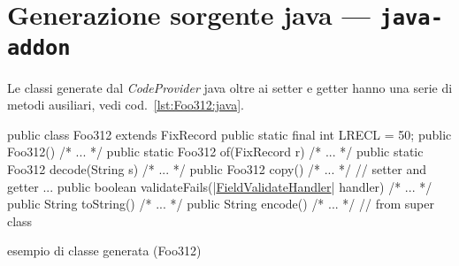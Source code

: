 \documentclass[a4paper,10pt]{report}
\newif\ifesource
\newenvironment{elisting}[1][H]
  {\captionsetup{aboveskip=0pt}\begin{listing}[#1]}
  {\end{listing}%
}
\begin{document}
\section{Generazione sorgente java --- \texttt{java-addon}} 
\label{sec:java.addon}
Le classi generate dal \textsl{CodeProvider} java oltre ai setter e getter
hanno una serie di metodi ausiliari, vedi cod.~\ref{lst:Foo312:java}.


\ifesource
\begin{figure*}[!htb]
\begin{lstlisting}[language=java, caption=esempio di classe generata (Foo312), 
label=lst:Foo312:java]
public class Foo312 extends FixRecord {
    public static final int LRECL = 50;
    public Foo312() { /* ... */ }
    public static Foo312 of(FixRecord r) { /* ... */ }
    public static Foo312 decode(String s) { /* ... */ }
    public Foo312 copy() { /* ... */ }
    // setter and getter ...
    public boolean validateFails((*\hyperref[lst:FieldValidateHandler:java]{FieldValidateHandler}*) handler) { /* ... */ }
    public String toString() { /* ... */ }
    public String encode() { /* ... */ }    // from super class
}
\end{lstlisting}
\end{figure*}
\else
\begin{elisting}[!htb]
\begin{javacode}
public class Foo312 extends FixRecord {
    public static final int LRECL = 50;
    public Foo312() { /* ... */ }
    public static Foo312 of(FixRecord r) { /* ... */ }
    public static Foo312 decode(String s) { /* ... */ }
    public Foo312 copy() { /* ... */ }
    // setter and getter ...
    public boolean validateFails(|\hyperref[lst:FieldValidateHandler:java]{FieldValidateHandler}| handler) { /* ... */ }
    public String toString() { /* ... */ }
    public String encode() { /* ... */ }    // from super class
}
\end{javacode}
\caption{esempio di classe generata (Foo312)}
\label{lst:Foo312:java}
\end{elisting}
\fi
\end{document}

